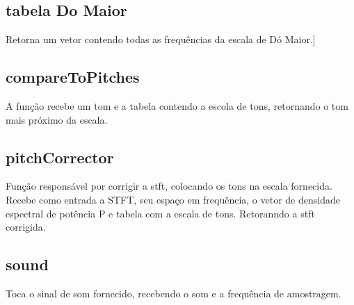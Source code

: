 \subsection*{tabela Do Maior}
Retorna um vetor contendo todas as frequências da escala de Dó Maior.]

\subsection*{compareToPitches}
A função recebe um tom e a tabela contendo a escola de tons, retornando o tom mais próximo da escala. 

\subsection*{pitchCorrector}
Função responsável por corrigir a stft, colocando os tons na escala fornecida. Recebe como entrada a STFT, seu espaço em frequência, o vetor de densidade espectral de potência P e tabela com a escala de tons. Retoranndo a stft corrigida.

\subsection*{sound}
Toca o sinal de som fornecido, recebendo o som e a frequência de amostragem.

